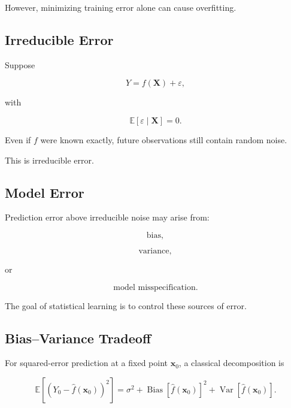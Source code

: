 However, minimizing training error alone can cause overfitting.

\subsection{Irreducible Error}
\label{subsec:irreducible-error}

Suppose

\[
\boxed{
Y
=
f(\mathbf{X})
+
\varepsilon,
}
\]

with

\[
\mathbb{E}
[
\varepsilon\mid\mathbf{X}
]
=
0.
\]

Even if \(f\) were known exactly, future observations still contain
random noise.

This is irreducible error.

\subsection{Model Error}
\label{subsec:model-error}

Prediction error above irreducible noise may arise from:

\[
\boxed{
\text{bias},
}
\]

\[
\boxed{
\text{variance},
}
\]

or

\[
\boxed{
\text{model misspecification}.
}
\]

The goal of statistical learning is to control these sources of error.

\subsection{Bias--Variance Tradeoff}
\label{subsec:bias-variance-tradeoff-learning}

For squared-error prediction at a fixed point \(\mathbf{x}_0\), a
classical decomposition is

\[
\boxed{
\mathbb{E}
\left[
(
Y_0
-
\widehat{f}(\mathbf{x}_0)
)^2
\right]
=
\sigma^2
+
\operatorname{Bias}
[
\widehat{f}(\mathbf{x}_0)
]^2
+
\operatorname{Var}
[
\widehat{f}(\mathbf{x}_0)
].
}
\]

